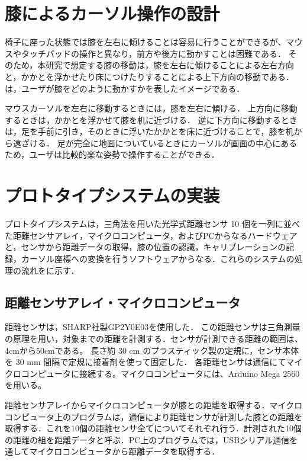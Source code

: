 \documentclass[submit, techrep]{ipsj}
\begin{document}
\section{膝によるカーソル操作の設計}
椅子に座った状態では膝を左右に傾けることは容易に行うことができるが、マウスやタッチパッドの操作と異なり，前方や後方に動かすことは困難である．
そのため，本研究で想定する膝の移動は，膝を左右に傾けることによる左右方向と，かかとを浮かせたり床につけたりすることによる上下方向の移動である．
は，ユーザが膝をどのように動かすかを表したイメージである．

マウスカーソルを左右に移動するときには，膝を左右に傾ける．
上方向に移動するときは，かかとを浮かせて膝を机に近づける．
逆に下方向に移動するときは，足を手前に引き，そのときに浮いたかかとを床に近づけることで，膝を机から遠ざける．
足が完全に地面についているときにカーソルが画面の中心にあるため，ユーザは比較的楽な姿勢で操作することができる．

\section{プロトタイプシステムの実装}
プロトタイプシステムは，三角法を用いた光学式距離センサ 10 個を一列に並べた距離センサアレイ，マイクロコンピュータ，およびPCからなるハードウェアと，センサから距離データの取得，膝の位置の認識，キャリブレーションの記録，カーソル座標への変換を行うソフトウェアからなる．これらのシステムの処理の流れをに示す．\par




\subsection{距離センサアレイ・マイクロコンピュータ}
距離センサは，SHARP社製GP2Y0E03を使用した．
この距離センサは三角測量の原理を用い，対象までの距離を計測する．センサが計測できる距離の範囲は、4\si{cm}から50\si{cm}である。
長さ約 30 \si{cm} のプラスティック製の定規に，センサ本体を 30 \si{mm} 間隔で定規に接着剤を使って固定した．
各距離センサは\iic 通信にてマイクロコンピュータに接続する。マイクロコンピュータには、Arduino Mega 2560を用いる。\par
距離センサアレイからマイクロコンピュータが膝との距離を取得する．マイクロコンピュータ上のプログラムは，\iic 通信により距離センサが計測した膝との距離を取得する．これを10個の距離センサ全てについてそれぞれ行う．計測された10個の距離の組を距離データと呼ぶ．PC上のプログラムでは，USBシリアル通信を通してマイクロコンピュータから距離データを取得する．
\end{document}
